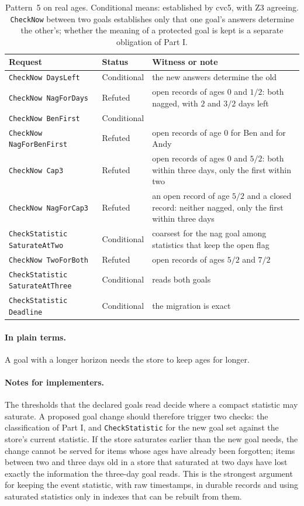 \documentclass[11pt]{article}
\newcommand{\code}[1]{\texttt{#1}}
\newcommand{\plain}{\paragraph{In plain terms.}}
\theoremstyle{definition}
\theoremstyle{plain}
\begin{document}
\begin{table}[ht]
\centering\small
\begin{tabularx}{\textwidth}{>{\raggedright\arraybackslash}p{4.4cm}>{\raggedright\arraybackslash}p{1.95cm}>{\raggedright\arraybackslash}X}
\toprule
Request & Status & Witness or note\\
\midrule
\code{CheckNow DaysLeft} & Conditional & the new answers determine the old\\
\code{CheckNow NagForDays} & Refuted & open records of ages $0$ and $1/2$: both nagged, with $2$ and
$3/2$ days left\\
\code{CheckNow BenFirst} & Conditional & \\
\code{CheckNow NagForBenFirst} & Refuted & open records of age $0$ for Ben and for Andy\\
\code{CheckNow Cap3} & Refuted & open records of ages $0$ and $5/2$: both within three days, only
the first within two\\
\code{CheckNow NagForCap3} & Refuted & an open record of age $5/2$ and a closed record: neither
nagged, only the first within three days\\
\code{CheckStatistic SaturateAtTwo} & Conditional & coarsest for the nag goal among statistics that
keep the open flag\\
\code{CheckNow TwoForBoth} & Refuted & open records of ages $5/2$ and $7/2$\\
\code{CheckStatistic SaturateAtThree} & Conditional & reads both goals\\
\code{CheckStatistic Deadline} & Conditional & the migration is exact\\
\bottomrule
\end{tabularx}
\caption{Pattern~5 on real ages. Conditional means: established by cvc5, with Z3 agreeing.
\code{CheckNow} between two goals establishes only that one goal's answers determine the other's;
whether the meaning of a protected goal is kept is a separate obligation of Part I.}\label{tab:lp5}
\end{table}

\plain A goal with a longer horizon needs the store to keep ages for longer.

\paragraph{Notes for implementers.} The thresholds that the declared goals read decide where a
compact statistic may saturate. A proposed goal change should therefore trigger two checks: the
classification of Part I, and \code{CheckStatistic} for the new goal set against the store's
current statistic. If the store saturates earlier than the new goal needs, the change cannot be
served for items whose ages have already been forgotten; items between two and three days old in a
store that saturated at two days have lost exactly the information the three-day goal reads. This is
the strongest argument for keeping the event statistic, with raw timestamps, in durable records and
using saturated statistics only in indexes that can be rebuilt from them.
\end{document}
